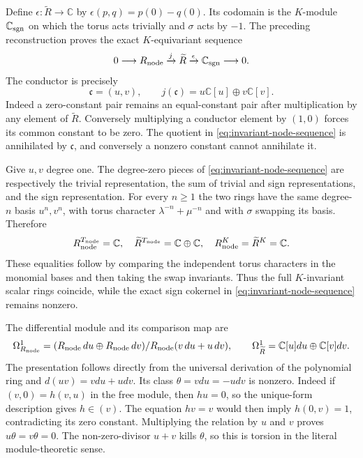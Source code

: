Define $\epsilon:\widetilde R\to\mathbb C$ by
$\epsilon(p,q)=p(0)-q(0)$. Its codomain is the $K$-module
$\mathbb C_{\rm sgn}$ on which the torus acts trivially and
$\sigma$ acts by $-1$. The preceding reconstruction proves the exact
$K$-equivariant sequence
\begin{equation}\label{eq:invariant-node-sequence}
 0\longrightarrow R_{\rm node}\xrightarrow{j}\widetilde R
 \xrightarrow{\epsilon}\mathbb C_{\rm sgn}\longrightarrow0.
\end{equation}
The conductor is precisely
\[
 \mathfrak c=(u,v),\qquad
 j(\mathfrak c)=u\mathbb C[u]\oplus v\mathbb C[v].
\]
Indeed a zero-constant pair remains an equal-constant pair after
multiplication by any element of $\widetilde R$. Conversely multiplying
a conductor element by $(1,0)$ forces its common constant to be zero.
The quotient in \eqref{eq:invariant-node-sequence} is annihilated by
$\mathfrak c$, and conversely a nonzero constant cannot annihilate it.

Give $u,v$ degree one. The degree-zero pieces of
\eqref{eq:invariant-node-sequence} are respectively the trivial
representation, the sum of trivial and sign representations, and the
sign representation. For every $n\ge1$ the two rings have the same
degree-$n$ basis $u^n,v^n$, with torus character
$\lambda^{-n}+\mu^{-n}$ and with $\sigma$ swapping its basis.
Therefore
\[
 R_{\rm node}^{T_{\rm node}}=\mathbb C,\quad
 \widetilde R^{T_{\rm node}}=\mathbb C\oplus\mathbb C,\quad
 R_{\rm node}^{K}=\widetilde R^K=\mathbb C.
\]
These equalities follow by comparing the independent torus characters
in the monomial bases and then taking the swap invariants. Thus the
full $K$-invariant scalar rings coincide, while the exact sign
cokernel in \eqref{eq:invariant-node-sequence} remains nonzero.

The differential module and its comparison map are
\[
 \Omega^1_{R_{\rm node}}=
 (R_{\rm node}\,du\oplus R_{\rm node}\,dv)/
       R_{\rm node}(v\,du+u\,dv),
 \qquad
 \Omega^1_{\widetilde R}=\mathbb C[u]du\oplus\mathbb C[v]dv.
\]
The presentation follows directly from the universal derivation of
the polynomial ring and $d(uv)=vdu+udv$. Its class
$\theta=vdu=-udv$ is nonzero. Indeed if $(v,0)=h(v,u)$ in the free
module, then $hu=0$, so the unique-form description gives $h\in(v)$.
The equation $hv=v$ would then imply $h(0,v)=1$, contradicting its
zero constant. Multiplying the relation by $u$ and $v$ proves
$u\theta=v\theta=0$. The non-zero-divisor $u+v$ kills $\theta$,
so this is torsion in the literal module-theoretic sense.

